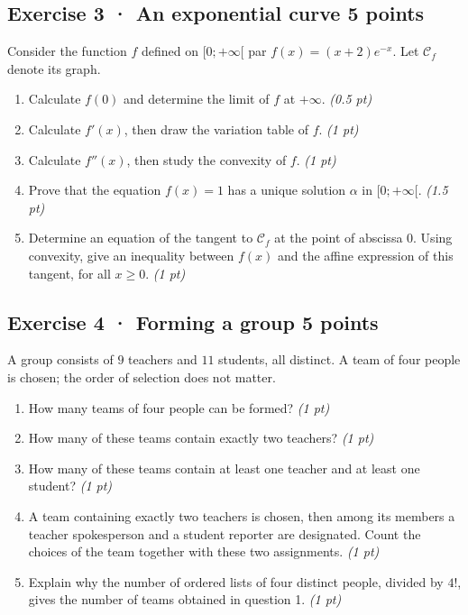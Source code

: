 \clearpage{}\par

\subsection*{Exercise 3 · An exponential curve \hfill 5 points}Consider the function $f$ defined on $[0;+\infty[$ par $f(x)=(x+2)e^{-x}$. Let $\mathcal C_f$ denote its graph.

\begin{enumerate}

\item Calculate $f(0)$ and determine the limit of $f$ at $+\infty$. \hfill\textit{(0.5 pt)}

\item Calculate $f'(x)$, then draw the variation table of $f$. \hfill\textit{(1 pt)}

\item Calculate $f''(x)$, then study the convexity of $f$. \hfill\textit{(1 pt)}

\item Prove that the equation $f(x)=1$ has a unique solution $\alpha$ in $[0;+\infty[$. \hfill\textit{(1.5 pt)}

\item Determine an equation of the tangent to $\mathcal C_f$ at the point of abscissa $0$. Using convexity, give an inequality between $f(x)$ and the affine expression of this tangent, for all $x\ge0$. \hfill\textit{(1 pt)}

\end{enumerate}

\subsection*{Exercise 4 · Forming a group \hfill 5 points}A group consists of $9$ teachers and $11$ students, all distinct. A team of four people is chosen; the order of selection does not matter.

\begin{enumerate}

\item How many teams of four people can be formed? \hfill\textit{(1 pt)}

\item How many of these teams contain exactly two teachers? \hfill\textit{(1 pt)}

\item How many of these teams contain at least one teacher and at least one student? \hfill\textit{(1 pt)}

\item A team containing exactly two teachers is chosen, then among its members a teacher spokesperson and a student reporter are designated. Count the choices of the team together with these two assignments. \hfill\textit{(1 pt)}

\item Explain why the number of ordered lists of four distinct people, divided by $4!$, gives the number of teams obtained in question 1. \hfill\textit{(1 pt)}

\end{enumerate}

